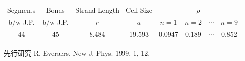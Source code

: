\documentclass[11pt, dvipdfmx]{beamer}
\begin{document}
\begin{frame}
\vspace{-1mm}
\begin{table}[htb]
 \centering
	\scriptsize
 \begin{tabular} {|c|c|c|c|c|c|c|c|} \hline
Segments	& Bonds	& Strand Length	& Cell Size	& \multicolumn{4}{|c|}{$\rho$}			\\ \cline{5-8}
b/w J.P. 	& b/w J.P.	& $r$		& $a$				& $n=1$	& $n=2$	& $\cdots$	& $n=9$	\\ \hline \hline
44			&	45	&	8.484		&	19.593	& 0.0947	& 0.189	& $\cdots$	& {\color{red}0.852} 		\\ \hline
\end{tabular}
\end{table}

\begin{alertblock}{先行研究}
R. Everaers, New J. Phys. 1999, 1, 12.
\end{alertblock}

\end{frame}
%
\end{document}
